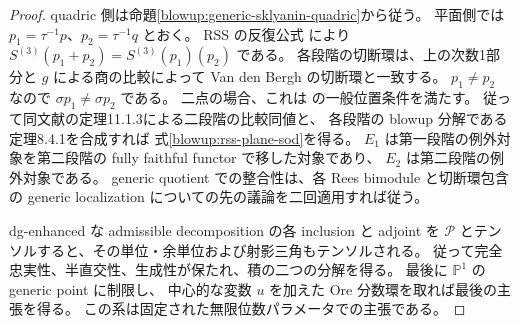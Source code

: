 \begin{proof}
quadric 側は命題\ref{blowup:generic-sklyanin-quadric}から従う。
平面側では $p_1=\tau^{-1}p$、$p_2=\tau^{-1}q$ とおく。
RSS の反復公式 \cite[命題5.4]{BlowupRSS2015} により
$S^{(3)}(p_1+p_2)=S^{(3)}(p_1)(p_2)$ である。
各段階の切断環は、上の次数1部分と $g$ による商の比較によって
Van den Bergh の切断環と一致する。
$p_1\ne p_2$ なので $\sigma p_1\ne\sigma p_2$ である。
二点の場合、これは \cite[定義11.1.2]{BlowupVdB2001} の一般位置条件を満たす。
従って同文献の定理11.1.3による二段階の比較同値と、
各段階の blowup 分解である定理8.4.1を合成すれば
式\eqref{blowup:rss-plane-sod}を得る。
$E_1$ は第一段階の例外対象を第二段階の fully faithful functor で移した対象であり、
$E_2$ は第二段階の例外対象である。
generic quotient での整合性は、各 Rees bimodule と切断環包含の
generic localization についての先の議論を二回適用すれば従う。

dg-enhanced な admissible decomposition の各 inclusion と adjoint を
$\mathcal P$ とテンソルすると、その単位・余単位および射影三角もテンソルされる。
従って完全忠実性、半直交性、生成性が保たれ、積の二つの分解を得る。
最後に $\mathbb P^1$ の generic point に制限し、
中心的な変数 $u$ を加えた Ore 分数環を取れば最後の主張を得る。
この系は固定された無限位数パラメータでの主張である。
\end{proof}
